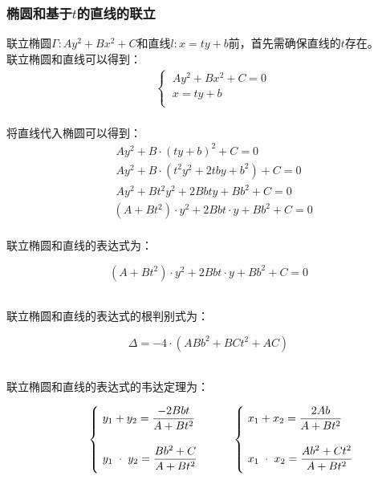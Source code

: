 \documentclass[UTF8]{ctexart}
\begin{document}
\newpage

\subsubsection{椭圆和基于$t$的直线的联立}
    \setcounter{equation}{0}
    联立椭圆$\Gamma:Ay^2+Bx^2+C$和直线$l:x=ty+b$前，首先需确保直线的$t$存在。\\[3mm]
    联立椭圆和直线可以得到：
    \begin{align}
        &\begin{cases}
            ~Ay^2+Bx^2+C=0\\[1mm]
            ~x=ty+b\\[1mm]
        \end{cases}
    \end{align}\\[1mm]
    将直线代入椭圆可以得到：
    \begin{align}
        &~Ay^2+B\cdot(ty+b)^2+C=0\\[5mm]
        &~Ay^2+B\cdot\left(t^2y^2+2tby+b^2\right)+C=0\\[5mm]
        &~Ay^2+Bt^2y^2+2Bbty+Bb^2+C=0\\[5mm]
        &\left(A+Bt^2\right)\cdot y^2+2Bbt\cdot y+Bb^2+C=0
    \end{align}\\
    联立椭圆和直线的表达式为：
    \begin{large}
        \begin{equation*}
            \left(A+Bt^2\right)\cdot y^2+2Bbt\cdot y+Bb^2+C=0
        \end{equation*}
    \end{large}\\
    联立椭圆和直线的表达式的根判别式为：
    \begin{large}
        \begin{equation*}
            \Delta=-4\cdot\left(ABb^2+BCt^2+AC\right)
        \end{equation*}
    \end{large}\\
    联立椭圆和直线的表达式的韦达定理为：\vspace{8pt}
    \begin{large}
        \begin{equation*}
            ~~~~~~~~~~\begin{cases}
                ~y_1+y_2=\dfrac{-2Bbt}{A+Bt^2}\\[6mm]
                ~y_1\hspace{3.0pt}\cdot\hspace{3.0pt}y_2=\dfrac{Bb^2+C}{A+Bt^2}\\[2mm]
            \end{cases}~~~~~~
            \begin{cases}
                ~x_1+x_2=\dfrac{2Ab}{A+Bt^2}\\[6mm]
                ~x_1\hspace{3.0pt}\cdot\hspace{3.0pt}x_2=\dfrac{Ab^2+Ct^2}{A+Bt^2}\\[2mm]
            \end{cases}
        \end{equation*}
    \end{large}\\[3mm]
\end{document}
